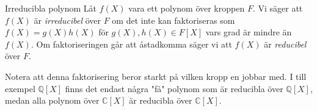 \documentclass{article}
\newcommand{\grad}[0]{\textnormal{deg}}
\theoremstyle{definition}
\begin{document}

\begin{mydef}{Irreducibla polynom}{}
  Låt $f(X)$ vara ett polynom över kroppen $F$. Vi säger att $f(X)$ är \textit{irreducibel} över $F$ om det inte kan faktoriseras som $f(X) = g(X)h(X)$
  för $g(X), h(X) \in F[X]$ vars grad är mindre än $f(X)$. Om faktoriseringen går att åstadkomma säger vi att $f(X)$ är \textit{reducibel} över $F.$
\end{mydef}
Notera att denna faktorisering beror starkt på vilken kropp en jobbar med. I till exempel $\mathbb{Q}[X]$ finns det endast några "få" polynom som är reducibla
över $\mathbb{Q}[X]$, medan alla polynom över $\mathbb{C}[X]$ är reducibla över $\mathbb{C}[X]$. 
\end{document}
